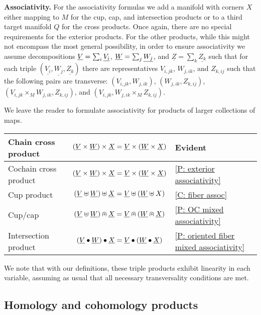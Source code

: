 \bigskip

\textbf{Associativity.}
For the associativity formulas we add a manifold with corners $X$ either mapping to $M$ for the cup, cap, and intersection products or to a third target manifold $Q$ for the cross products. Once again, there are no special requirements for the exterior products. For the other products, while this might not encompass the most general possibility, in order to ensure associativity we assume decompositions $\underline{V} = \sum_i \underline{V_i}$, $\underline{W} = \sum_j \underline{W_j}$, and $\underline{Z} = \sum_k \underline{Z_k}$ such that for each triple $(\underline{V_i},\underline{W_j}, \underline{Z_k})$ there are representatives $V_{i,jk}$, $W_{j,ik}$, and $Z_{k,ij}$ such that the following pairs are transverse: $(V_{i,jk}, W_{j,ik})$, $(W_{j,ik},Z_{k,ij})$, $(V_{i,jk} \times_M W_{j,ik},Z_{k,ij})$, and $(V_{i,jk}, W_{j,ik} \times_M Z_{k,ij})$.

We leave the reader to formulate associativity for products of larger collections of maps.

\bigskip

\begin{minipage}{\linewidth}
\centering

\begin{tabular}{|l|c|l|}
\hline
Chain cross product& $(\underline{V} \times \underline{W}) \times \underline{X} = \underline{V} \times (\underline{W} \times \underline{X})$&Evident\\
\hline
Cochain cross product& $(\underline{V} \times \underline{W}) \times \underline{X} = \underline{V} \times (\underline{W} \times \underline{X})$&\cref{P: exterior associativity}\\
\hline
Cup product &$(\underline{V}\uplus \underline{W})\uplus\underline{X} = \underline{V}\uplus(\underline{W}\uplus X)$&\cref{C: fiber assoc} \\
\hline
Cup/cap & $(\underline{V} \uplus \underline{W})\nplus \underline{X} = \underline{V}\nplus(\underline{W}\nplus\underline{X})$& \cref{P: OC mixed associativity}\\
\hline
Intersection product &
$(\underline{V}\bullet\underline{W})\bullet\underline{X} = \underline{V}\bullet(\underline{W}\bullet \underline{X})$&\cref{P: oriented fiber mixed associativity}\\
\hline
\end{tabular}
\end{minipage}

\bigskip

We note that with our definitions, these triple products exhibit linearity in each variable, assuming as usual that all necessary transversality conditions are met.

\subsection{Homology and cohomology products}\label{S: homology products}

